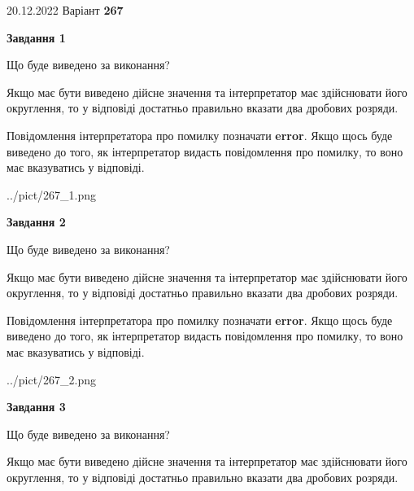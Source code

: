\documentclass[12pt, ukrainian]{article}
\begin{document}
{20.12.2022 Варіант \No \textbf { 267 }\par}
{
\begin {Large}

{\begin {center}\textbf{Завдання 1}\end {center}}\par
Що буде виведено за виконання? \par

Якщо має бути виведено дійсне значення та інтерпретатор має здійснювати його округлення, 
то у відповіді достатньо правильно вказати два дробових розряди.

Повідомлення інтерпретатора про помилку позначати \textbf{error}.
Якщо щось буде виведено до того, як інтерпретатор видасть повідомлення про помилку, 
то воно має вказуватись у відповіді. \par

\begin{center}
	{../pict/267_1.png}
\end{center}
\newpage

{\begin {center}\textbf{Завдання 2}\end {center}}\par
Що буде виведено за виконання? \par

Якщо має бути виведено дійсне значення та інтерпретатор має здійснювати його округлення, 
то у відповіді достатньо правильно вказати два дробових розряди.

Повідомлення інтерпретатора про помилку позначати \textbf{error}.
Якщо щось буде виведено до того, як інтерпретатор видасть повідомлення про помилку, 
то воно має вказуватись у відповіді. \par

\begin{center}
	{../pict/267_2.png}
\end{center}
\newpage

{\begin {center}\textbf{Завдання 3}\end {center}}\par
Що буде виведено за виконання? \par

Якщо має бути виведено дійсне значення та інтерпретатор має здійснювати його округлення, 
то у відповіді достатньо правильно вказати два дробових розряди.


\end{Large}}
\end{document}
